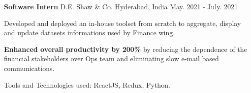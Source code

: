 \begin{cventries}
\cventry
  {\textbf{Software Intern}} %
  {D.E. Shaw \& Co.} %
  {Hyderabad, India} %
  {May. 2021 - July. 2021} %
  {
    \begin{cvitems} %
      \item {Developed and deployed an in-house toolset from scratch to aggregate, display and update datasets informations used by Finance wing.}
      \item {\textbf{Enhanced overall productivity by 200\%} by reducing the dependence of the financial stakeholders over Ops team and eliminating slow e-mail based communications.}
      \item {Tools and Technologies used: ReactJS, Redux, Python.}
    \end{cvitems}
  }


\end{cventries}

